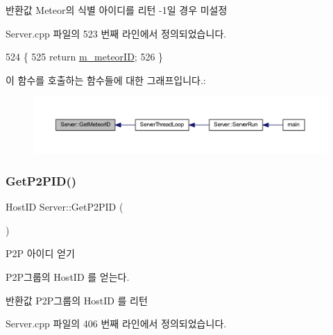 \begin{DoxyReturn}{반환값}
Meteor의 식별 아이디를 리턴 -\/1일 경우 미설정 
\end{DoxyReturn}


Server.\+cpp 파일의 523 번째 라인에서 정의되었습니다.


\begin{DoxyCode}
524 \{
525     \textcolor{keywordflow}{return} \hyperlink{class_server_ab4f0de3a4d653f8b8631caf922643414}{m\_meteorID};
526 \}
\end{DoxyCode}
이 함수를 호출하는 함수들에 대한 그래프입니다.\+:\nopagebreak
\begin{figure}[H]
\begin{center}
\leavevmode
\includegraphics[width=350pt]{class_server_a2c9b6a25a8add5d74b5f3bcfeff956ec_icgraph}
\end{center}
\end{figure}
\mbox{\label{class_server_ac6e03fa95f91583bd117f4910257b7be}} 
\subsubsection{\texorpdfstring{Get\+P2\+P\+I\+D()}{GetP2PID()}}
{\footnotesize\ttfamily Host\+ID Server\+::\+Get\+P2\+P\+ID (\begin{DoxyParamCaption}{ }\end{DoxyParamCaption})}



P2P 아이디 얻기 

P2\+P그룹의 Host\+ID 를 얻는다.

\begin{DoxyReturn}{반환값}
P2\+P그룹의 Host\+ID 를 리턴 
\end{DoxyReturn}


Server.\+cpp 파일의 406 번째 라인에서 정의되었습니다.


